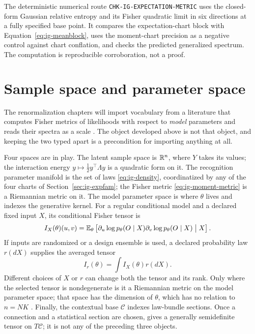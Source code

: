 The deterministic numerical route \texttt{CHK-IG-EXPECTATION-METRIC} uses the closed-form Gaussian relative entropy and its Fisher quadratic limit in six directions at a fully specified base point. It compares the expectation-chart block with Equation~\eqref{eq:ig-meanblock}, uses the moment-chart precision as a negative control against chart conflation, and checks the predicted generalized spectrum. The computation is reproducible corroboration, not a proof. 

\section{Sample space and parameter space}
\label{sec:ig-typing}

The renormalization chapters will import vocabulary from a literature that computes Fisher metrics of likelihoods with respect to \emph{model} parameters and reads their spectra as a scale \citep{BermanKlingerStapleton2023}. The object developed above is not that object, and keeping the two typed apart is a precondition for importing anything at all.

Four spaces are in play. The latent sample space is $\mathbb R^{n}$, where $Y$ takes
its values; the interaction energy
$y\mapsto\tfrac12 y^\top\Lambda y$ is a quadratic form on it. The recognition
parameter manifold is the set of laws \eqref{eq:ig-density}, coordinatized by
any of the four charts of Section~\ref{sec:ig-expfam}; the Fisher metric
\eqref{eq:ig-moment-metric} is a Riemannian metric on it. The model parameter
space is where $\theta$ lives and indexes the generative kernel. For a regular
conditional model and a declared fixed input $X$, its conditional Fisher
tensor is
\begin{equation}
I_X(\theta)(u,v)
=\mathbb E_\theta\left[
\partial_u\log p_\theta(O\mid X)
\partial_v\log p_\theta(O\mid X)
\mathrel{\big|}X
\right].
\label{eq:ig-conditional-model-fisher}
\end{equation}
If inputs are randomized or a design ensemble is used, a declared probability
law $r(dX)$ supplies the averaged tensor
\begin{equation}
I_r(\theta)=\int I_X(\theta)r(dX).
\label{eq:ig-averaged-model-fisher}
\end{equation}
Different choices of $X$ or $r$ can change both the tensor and its rank.
Only where the selected tensor is nondegenerate is it a Riemannian metric on
the model parameter space; that space has the dimension of $\theta$, which
has no relation to $n=NK$ \citep{Amari1998,AmariNagaoka2000}. Finally, the
contextual base $\mathcal C$ indexes law-bundle sections. Once a connection
and a statistical section are chosen,
 gives a generally semidefinite tensor
on $T\mathcal C$; it is not any of the preceding three objects.

